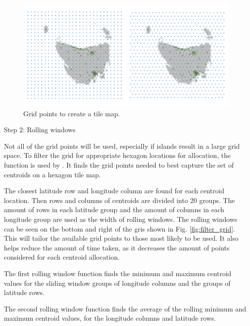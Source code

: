 \documentclass[
]{jss}
\begin{document}
\begin{CodeChunk}
\begin{figure}

{\centering \includegraphics[width=1\linewidth]{figures/2grid} 

}

\caption[Grid points to create a tile map]{Grid points to create a tile map.}\label{fig:grid2}
\end{figure}
\end{CodeChunk}

Step 2: Rolling windows

Not all of the grid points will be used, especially if islands result in
a large grid space. To filter the grid for appropriate hexagon locations
for allocation, the  function is used by
. It finds the grid points needed to best capture the
set of centroids on a hexagon tile map.

The closest latitude row and longitude column are found for each
centroid location. Then rows and columns of centroids are divided into
20 groups. The amount of rows in each latitude group and the amount of
columns in each longitude group are used as the width of rolling
windows. The rolling windows can be seen on the bottom and right of the
gris shown in Fig. \ref{fig:filter_grid}. This will tailor the available
grid points to those most likely to be used. It also helps reduce the
amount of time taken, as it decreases the amount of points considered
for each centroid allocation.

The first rolling window function finds the minimum and maximum centroid
values for the sliding window groups of longitude columns and the groups
of latitude rows.

The second rolling window function finds the average of the rolling
minimum and maximum centroid values, for the longitude columns and
latitude rows.
\end{document}
